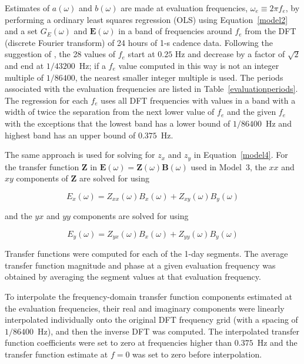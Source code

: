 \documentclass[draft,linenumbers]{agujournal2018}
\begin{document}
Estimates of $a(\omega)$ and $b(\omega)$ are made at evaluation frequencies, $\omega_e \equiv 2\pi f_e$, by performing a ordinary least squares regression (OLS) using Equation~\ref{model2} and a set $G_E(\omega)$ and $\mathbf{E}(\omega)$ in a band of frequencies around $f_e$ from the DFT (discrete Fourier transform) of 24 hours of 1-s cadence data. Following the suggestion of \cite{Simpson2005}, the 28 values of $f_e$ start at $0.25$ Hz and decrease by a factor of $\sqrt{2}$ and end at $1/43200$~Hz; if a $f_e$ value computed in this way is not an integer multiple of $1/86400$, the nearest smaller integer multiple is used. The periods associated with the evaluation frequencies are listed in Table~\ref{evaluationperiods}. The regression for each $f_e$ uses all DFT frequencies with values in a band with a width of twice the separation from the next lower value of $f_e$ and the given $f_e$ with the exceptions that the lowest band has a lower bound of $1/86400$~Hz and highest band has an upper bound of $0.375$~Hz.

The same approach is used for solving for $z_x$ and $z_y$ in Equation~\ref{model4}. For the transfer function $\boldsymbol{Z}$ in $\mathbf{E}(\omega) = \boldsymbol{Z}(\omega)\mathbf{B}(\omega)$ used in Model~3, the $xx$ and $xy$ components of $\boldsymbol{Z}$ are solved for using

\begin{linenomath*}
  \begin{equation*}
    E_x(\omega) = Z_{xx}(\omega)B_x(\omega) + Z_{xy}(\omega)B_{y}(\omega)
  \end{equation*}
\end{linenomath*}

\noindent
and the $yx$ and $yy$ components are solved for using

\begin{linenomath*}
  \begin{equation*}
    E_y(\omega) = Z_{yx}(\omega)B_x(\omega) + Z_{yy}(\omega)B_y(\omega)
  \end{equation*}
\end{linenomath*}

Transfer functions were computed for each of the 1-day segments. The average transfer function magnitude and phase at a given evaluation frequency was obtained by averaging the segment values at that evaluation frequency.

To interpolate the frequency-domain transfer function components estimated at the evaluation frequencies, their real and imaginary components were linearly interpolated individually onto the original DFT frequency grid (with a spacing of $1/86400$~Hz), and then the inverse DFT was computed. The interpolated transfer function coefficients were set to zero at frequencies higher than $0.375$~Hz and the transfer function estimate at $f=0$ was set to zero before interpolation.
\end{document}
